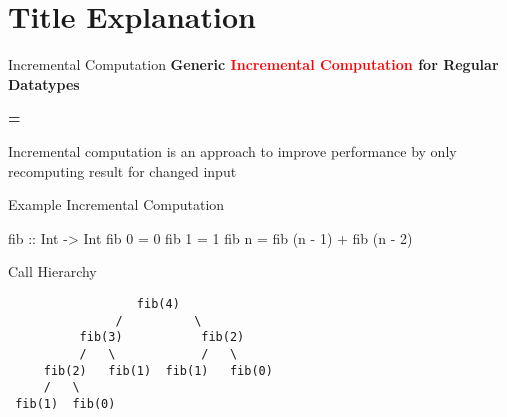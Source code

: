 \section{Title Explanation}


\begin{slide}{Incremental Computation}
\centering
\large \textbf{Generic \textcolor{red}{Incremental Computation} for Regular Datatypes}

\vspace*{.5cm}
\textbf{=}
\vspace*{.5cm}

Incremental computation is an approach to improve performance by only recomputing result for changed input

\end{slide}


\begin{slide}{Example Incremental Computation}
\begin{haskell}
fib :: Int -> Int
fib 0 = 0
fib 1 = 1
fib n = fib (n - 1) + fib (n - 2)
\end{haskell}

Call Hierarchy

\begin{center}  
\begin{verbatim}
                  fib(4)  
               /          \
          fib(3)           fib(2)
          /   \            /   \
     fib(2)   fib(1)  fib(1)   fib(0)
     /   \
 fib(1)  fib(0)
\end{verbatim}
\end{center}
\end{slide}

